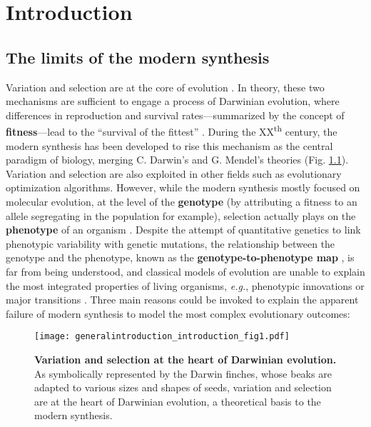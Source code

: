 

\chapter{Introduction}
\label{ch:general_introduction:introduction}


\section{The limits of the modern synthesis}
\label{sec:general_introduction:introduction:darwin_limits}

Variation and selection are at the core of evolution \citep{darwin-1859}. In theory, these two mechanisms are sufficient to engage a process of Darwinian evolution, where differences in reproduction and survival rates---summarized by the concept of \textbf{fitness}---lead to the ``survival of the fittest'' \citep{spencer-1864}. During the XX\textsuperscript{th} century, the modern synthesis has been developed to rise this mechanism as the central paradigm of biology, merging C. Darwin's and G. Mendel's theories \citep{huxley-1942} (Fig. \ref{fig:general_introduction:introduction:fig1}). Variation and selection are also exploited in other fields such as evolutionary optimization algorithms. However, while the modern synthesis mostly focused on molecular evolution, at the level of the \textbf{genotype} (by attributing a fitness to an allele segregating in the population for example), selection actually plays on the \textbf{phenotype} of an organism \citep{lande-1976}. Despite the attempt of quantitative genetics to link phenotypic variability with genetic mutations, the relationship between the genotype and the phenotype, known as the \textbf{genotype-to-phenotype map} \citep{alberch-1991}, is far from being understood, and classical models of evolution are unable to explain the most integrated properties of living organisms, \textit{e.g.}, phenotypic innovations or major transitions \citep{smith-szathmary-1997}. Three main reasons could be invoked to explain the apparent failure of modern synthesis to model the most complex evolutionary outcomes:

\begin{figure}[!h]
\centering
\texttt{[image: generalintroduction\_introduction\_fig1.pdf]}
\caption[Variation and selection at the heart of Darwinian evolution.]{{\bf Variation and selection at the heart of Darwinian evolution.} As symbolically represented by the Darwin finches, whose beaks are adapted to various sizes and shapes of seeds, variation and selection are at the heart of Darwinian evolution, a theoretical basis to the modern synthesis.}
\label{fig:general_introduction:introduction:fig1}
\end{figure}

